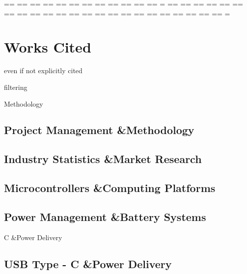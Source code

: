     == == == == == == == == == == == ==
    = %
      == == == == == == == == == == == == == == == == == == == == == == ==
    =

\section {
  Works Cited
}
\label{sec : works - cited}

    even if not explicitly cited
\nocite{*}

                  filtering

        Methodology
\subsection {
  Project Management \&Methodology
}
\printbibliography[heading = none, keyword = management]

\subsection {
  Industry Statistics \&Market Research
}
\printbibliography[heading = none, keyword = market]

\subsection {
  Microcontrollers \&Computing Platforms
}
\printbibliography[heading = none, keyword = computing]

\subsection {
  Power Management \&Battery Systems
}
\printbibliography[heading = none, keyword = power]

    C &Power Delivery
\subsection {
  USB Type - C \&Power Delivery
}
\printbibliography[heading = none, keyword = usbc]

